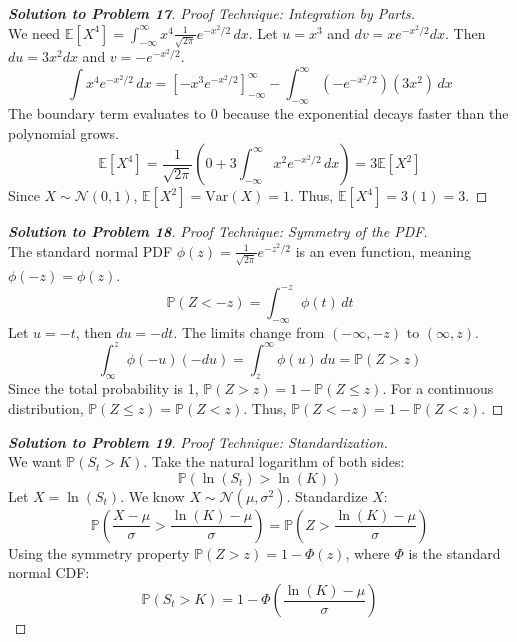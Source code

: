 \documentclass[11pt, a4paper]{article}
\theoremstyle{definition}
\theoremstyle{remark}
\newcommand{\E}{\mathbb{E}}
\newcommand{\Prob}{\mathbb{P}}
\begin{document}
\begin{proof}[\textbf{Solution to Problem 17}]
\textit{Proof Technique: Integration by Parts.} \\
We need $\E[X^4] = \int_{-\infty}^{\infty} x^4 \frac{1}{\sqrt{2\pi}} e^{-x^2/2} \, dx$.
Let $u = x^3$ and $dv = x e^{-x^2/2} dx$. Then $du = 3x^2 dx$ and $v = -e^{-x^2/2}$.
\[ \int x^4 e^{-x^2/2} \, dx = \left[ -x^3 e^{-x^2/2} \right]_{-\infty}^{\infty} - \int_{-\infty}^{\infty} (-e^{-x^2/2})(3x^2) \, dx \]
The boundary term evaluates to $0$ because the exponential decays faster than the polynomial grows.
\[ \E[X^4] = \frac{1}{\sqrt{2\pi}} \left( 0 + 3 \int_{-\infty}^{\infty} x^2 e^{-x^2/2} \, dx \right) = 3 \E[X^2] \]
Since $X \sim \mathcal{N}(0, 1)$, $\E[X^2] = \text{Var}(X) = 1$. Thus, $\E[X^4] = 3(1) = 3$.
\end{proof}

\begin{proof}[\textbf{Solution to Problem 18}]
\textit{Proof Technique: Symmetry of the PDF.} \\
The standard normal PDF $\phi(z) = \frac{1}{\sqrt{2\pi}}e^{-z^2/2}$ is an even function, meaning $\phi(-z) = \phi(z)$.
\[ \Prob(Z < -z) = \int_{-\infty}^{-z} \phi(t) \, dt \]
Let $u = -t$, then $du = -dt$. The limits change from $(-\infty, -z)$ to $(\infty, z)$.
\[ \int_{\infty}^{z} \phi(-u) (-du) = \int_{z}^{\infty} \phi(u) \, du = \Prob(Z > z) \]
Since the total probability is 1, $\Prob(Z > z) = 1 - \Prob(Z \leq z)$. For a continuous distribution, $\Prob(Z \leq z) = \Prob(Z < z)$.
Thus, $\Prob(Z < -z) = 1 - \Prob(Z < z)$.
\end{proof}

\begin{proof}[\textbf{Solution to Problem 19}]
\textit{Proof Technique: Standardization.} \\
We want $\Prob(S_t > K)$. Take the natural logarithm of both sides:
\[ \Prob(\ln(S_t) > \ln(K)) \]
Let $X = \ln(S_t)$. We know $X \sim \mathcal{N}(\mu, \sigma^2)$. Standardize $X$:
\[ \Prob\left(\frac{X - \mu}{\sigma} > \frac{\ln(K) - \mu}{\sigma}\right) = \Prob\left(Z > \frac{\ln(K) - \mu}{\sigma}\right) \]
Using the symmetry property $\Prob(Z > z) = 1 - \Phi(z)$, where $\Phi$ is the standard normal CDF:
\[ \Prob(S_t > K) = 1 - \Phi\left(\frac{\ln(K) - \mu}{\sigma}\right) \]
\end{proof}
\end{document}
